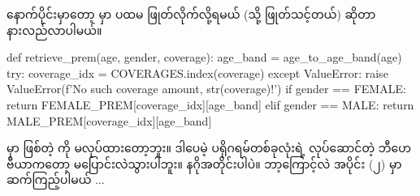 နောက်ပိုင်းမှာတော့  မှာ ပထမ  ဖြုတ်လိုက်လို့ရမယ် (သို့ ဖြုတ်သင့်တယ်) ဆိုတာ နားလည်လာပါမယ်။
%
\begin{py}
def retrieve_prem(age, gender, coverage):
    age_band = age_to_age_band(age)
    try:
        coverage_idx = COVERAGES.index(coverage)
    except ValueError:
        raise ValueError(f'No such coverage amount, {str(coverage)}!')
    if gender == FEMALE:
        return FEMALE_PREM[coverage_idx][age_band]
    elif gender == MALE:
        return MALE_PREM[coverage_idx][age_band]
\end{py}
%
 မှာ ဖြစ်တဲ့  ကို  မလုပ်ထားတော့ဘူး။ ဒါပေမဲ့ ပရိုဂရမ်တစ်ခုလုံးရဲ့ လုပ်ဆောင်တဲ့ ဘီဟေဗီယာကတော့ မပြောင်းလဲသွားပါဘူး။ နဂိုအတိုင်းပါပဲ။ ဘာ့ကြောင့်လဲ အပိုင်း (၂) မှာ ဆက်ကြည့်ပါမယ် $\ldots$

